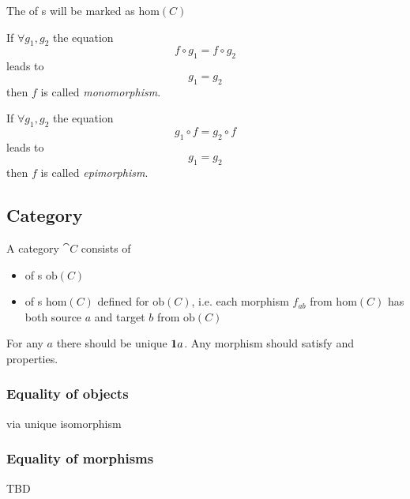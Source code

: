 \begin{remark}
\label{rem:morphclass}
The  of s will be marked as 
$\mathrm{hom}(C)$
\end{remark}

\begin{definition}[Monomorphism]
\label{def:monomorphism}
If $\forall g_1, g_2$ the equation 
\[
f \circ g_1 = f \circ g_2
\]
leads to 
\[
g_1 = g_2
\]
then $f$ is called \textit{monomorphism}.
\end{definition}

\begin{definition}[Epimorphism]
\label{def:epimorphism}
If $\forall g_1, g_2$ the equation 
\[
g_1 \circ f = g_2 \circ f
\]
leads to 
\[
g_1 = g_2
\]
then $f$ is called \textit{epimorphism}.
\end{definition}


\subsection{Category}

\begin{definition}[Category]
\label{def:category}
A category $\cat{C}$ consists of 
\begin{itemize}
\item {} of
s $\mathrm{ob}(C)$
\item {} of s $\mathrm{hom}(C)$
defined for $\mathrm{ob}(C)$, i.e. each morphism $f_{ab}$ from 
$\mathrm{hom}(C)$ has both source
$a$ and target $b$ from $\mathrm{ob}(C)$
\end{itemize}
For any  $a$ there should be unique
 $\idarrow[a]$. Any morphism should satisfy
 and 
properties.  

\end{definition}

\subsubsection{Equality of objects}
via unique isomorphism

\subsubsection{Equality of morphisms}
TBD

